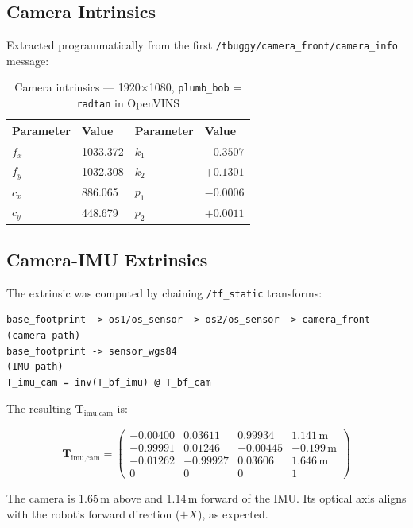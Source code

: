 \documentclass[10pt,a4paper]{article}
\begin{document}
\subsection{Camera Intrinsics}

Extracted programmatically from the first \texttt{/tbuggy/camera\_front/camera\_info} message:

\begin{table}[H]
\centering
\caption{Camera intrinsics --- 1920$\times$1080, \texttt{plumb\_bob} = \texttt{radtan} in OpenVINS}
\begin{tabular}{ll|ll}
\toprule
Parameter & Value & Parameter & Value \\
\midrule
$f_x$ & 1033.372 & $k_1$ & $-0.3507$ \\
$f_y$ & 1032.308 & $k_2$ &  $+0.1301$ \\
$c_x$ &  886.065 & $p_1$ & $-0.0006$ \\
$c_y$ &  448.679 & $p_2$ & $+0.0011$ \\
\bottomrule
\end{tabular}
\end{table}

\subsection{Camera-IMU Extrinsics}

The extrinsic was computed by chaining \texttt{/tf\_static} transforms:

\begin{lstlisting}
base_footprint -> os1/os_sensor -> os2/os_sensor -> camera_front   (camera path)
base_footprint -> sensor_wgs84                                      (IMU path)
T_imu_cam = inv(T_bf_imu) @ T_bf_cam
\end{lstlisting}

The resulting $\mathbf{T}_{\text{imu,cam}}$ is:

\begin{equation*}
\mathbf{T}_{\text{imu,cam}} =
\begin{pmatrix}
-0.00400 &  0.03611 &  0.99934 & 1.141\,\text{m}\\
-0.99991 &  0.01246 & -0.00445 & -0.199\,\text{m}\\
-0.01262 & -0.99927 &  0.03606 & 1.646\,\text{m}\\
0 & 0 & 0 & 1
\end{pmatrix}
\end{equation*}

The camera is 1.65\,m above and 1.14\,m forward of the IMU. Its optical axis aligns with
the robot's forward direction ($+X$), as expected.
\end{document}
